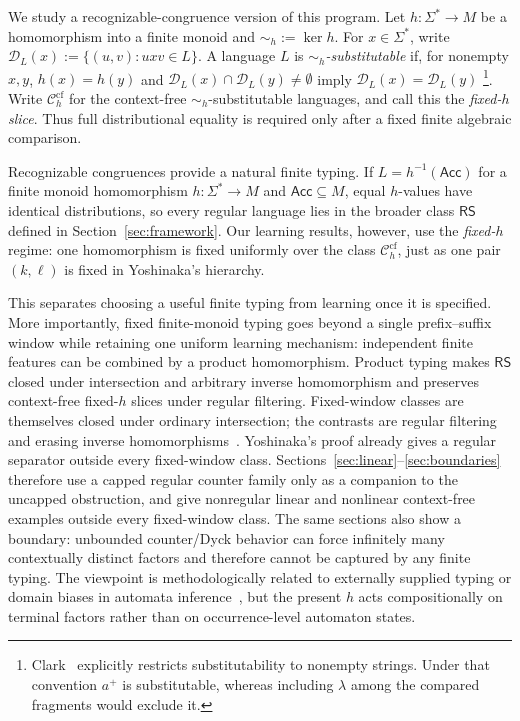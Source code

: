 \documentclass[11pt,a4paper]{article}
\theoremstyle{remark}
\theoremstyle{plain}
\newcommand{\D}{\mathcal{D}}
\newcommand{\cf}{\mathrm{cf}}
\newcommand{\Ccf}[1]{\mathcal C_{#1}^{\cf}}
\begin{document}
We study a recognizable-congruence version of this program.  Let
$h:\Sigma^*\to M$ be a homomorphism into a finite monoid and
$\sim_h:=\ker h$.  For $x\in\Sigma^*$, write
$\D_L(x):=\{(u,v):uxv\in L\}$.  A language $L$ is
\emph{$\sim_h$-substitutable} if, for nonempty $x,y$,
$h(x)=h(y)$ and $\D_L(x)\cap\D_L(y)\ne\emptyset$ imply
$\D_L(x)=\D_L(y)$%
\footnote{Clark~\cite{clark2013} explicitly restricts substitutability to
nonempty strings.  Under that convention $a^+$ is substitutable, whereas
including $\lambda$ among the compared fragments would exclude it.}.  Write $\Ccf{h}$ for the context-free
$\sim_h$-substitutable languages, and call this the \emph{fixed-$h$ slice}.
Thus full distributional equality is required only after a fixed finite
algebraic comparison.

Recognizable congruences provide a natural finite typing.  If $L=h^{-1}(\mathsf{Acc})$ for a finite monoid homomorphism
$h:\Sigma^*\to M$ and $\mathsf{Acc}\subseteq M$, equal $h$-values have
identical distributions, so every regular language lies in the broader
class $\mathsf{RS}$ defined in Section~\ref{sec:framework}.  Our learning
results, however, use the \emph{fixed-$h$} regime: one homomorphism is fixed
uniformly over the class $\Ccf{h}$, just as one pair $(k,\ell)$ is fixed in
Yoshinaka's hierarchy.

This separates choosing a useful finite typing from learning once it is
specified.  More importantly, fixed finite-monoid typing goes beyond a single
prefix--suffix window while retaining one uniform learning mechanism:
independent finite features can be combined by a product homomorphism.  Product typing makes $\mathsf{RS}$ closed under intersection and arbitrary
inverse homomorphism and preserves context-free fixed-$h$ slices under regular
filtering.  Fixed-window classes are themselves closed under ordinary
intersection; the contrasts are regular filtering and erasing inverse
homomorphisms~\cite[Proposition~1]{yoshinaka2008}.  Yoshinaka's proof already
gives a regular separator outside every fixed-window class.  Sections~\ref{sec:linear}--\ref{sec:boundaries}
therefore use a capped regular counter family only as a companion to the
uncapped obstruction, and give nonregular linear and nonlinear context-free
examples outside every fixed-window class.
The same sections also show a boundary: unbounded counter/Dyck behavior can
force infinitely many contextually distinct factors and therefore cannot be
captured by any finite typing.  The viewpoint is methodologically related to
externally supplied typing or domain biases in automata
inference~\cite{coste-typing2004}, but the present $h$ acts compositionally
on terminal factors rather than on occurrence-level automaton states.
\end{document}
